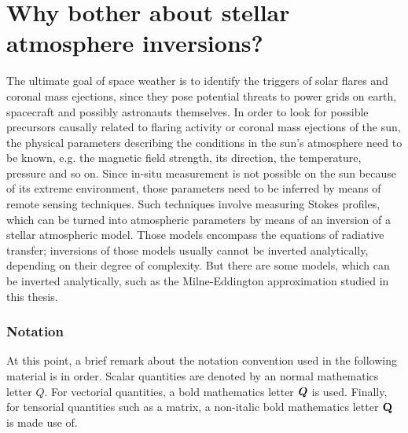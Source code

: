 \documentclass[a4paper,12pt]{report}
\begin{document}
\section{Why bother about stellar atmosphere inversions?}
The ultimate goal of space weather is to identify the triggers of solar flares and coronal mass ejections, since they pose potential threats to power grids on earth, spacecraft and possibly astronauts themselves. In order to look for possible precursors causally related to flaring activity or coronal mass ejections of the sun, the physical parameters describing the conditions in the sun's atmosphere need to be known, e.g. the magnetic field strength, its direction, the temperature, pressure and so on. Since in-situ measurement is not possible on the sun because of its extreme environment, those parameters need to be inferred by means of remote sensing techniques. Such techniques involve measuring Stokes profiles, which can be turned into atmospheric parameters by means of an inversion of a stellar atmospheric model. Those models encompass the equations of radiative transfer; inversions of those models usually cannot be inverted analytically, depending on their degree of complexity. But there are some models, which can be inverted analytically, such as the Milne-Eddington approximation studied in this thesis.








\subsubsection{Notation}
At this point, a brief remark about the notation convention used in the following material is in order. Scalar quantities are denoted by an normal mathematics letter $Q$. For vectorial quantities, a bold mathematics letter $\bm{Q}$ is used. Finally, for tensorial quantities such as a matrix, a non-italic bold mathematics letter $\boldsymbol{\mathbf{Q}}$ is made use of.
\end{document}
